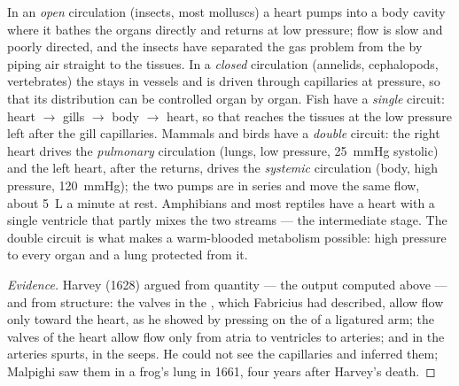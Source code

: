 \begin{definition}\label{def:b2:blood-circulation:circuits}
In an \emph{open} circulation (insects, most molluscs) a heart pumps
 into a body cavity where it bathes the organs directly and
returns at low pressure; flow is slow and poorly directed, and the
insects have separated the gas problem from the  by piping air
straight to the tissues. In a \emph{closed} circulation (annelids,
cephalopods, vertebrates) the  stays in vessels and is driven
through capillaries at pressure, so that its distribution can be
controlled organ by organ. Fish have a \emph{single} circuit: heart
$\to$ gills $\to$ body $\to$ heart, so that  reaches the tissues
at the low pressure left after the gill capillaries. Mammals and
birds have a \emph{double} circuit: the right heart drives the
\emph{pulmonary} circulation (lungs, low pressure, \qty{25}{mmHg}
systolic) and the left heart, after the  returns, drives the
\emph{systemic} circulation (body, high pressure, \qty{120}{mmHg});
the two pumps are in series and move the same flow, about \qty{5}{L}
a minute at rest. Amphibians and most reptiles have a heart with a
single ventricle that partly mixes the two streams --- the
intermediate stage. The double circuit is what makes a warm-blooded
metabolism possible: high pressure to every organ and a lung
protected from it.
\end{definition}
\begin{proof}[Evidence]
Harvey (1628) argued from quantity --- the output computed above ---
and from structure: the valves in the , which Fabricius had
described, allow flow only toward the heart, as he showed by
pressing on the  of a ligatured arm; the valves of the heart
allow flow only from atria to ventricles to arteries; and  in
the arteries spurts, in the  seeps. He could not see the
capillaries and inferred them; Malpighi saw them in a frog's lung
in 1661, four years after Harvey's death.
\end{proof}

